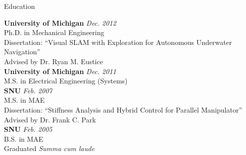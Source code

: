 \begin{rSection}{Education}

{\bf University of Michigan} \hfill {\em Dec. 2012} \\
Ph.D. in Mechanical Engineering \\
Dissertation: ``Visual SLAM with Exploration for Autonomous Underwater Navigation'' \\
Advised by Dr. Ryan M. Eustice \\

{\bf University of Michigan} \hfill {\em Dec. 2011} \\
M.S. in Electrical Engineering (Systems) \\

{\bf \ac{SNU}} \hfill {\em Feb. 2007} \\
M.S. in \acf{MAE} \\
Dissertation: ``Stiffness Analysis and Hybrid Control for Parallel Manipulator''\\
Advised by Dr. Frank C. Park\\

{\bf \acf{SNU}} \hfill {\em Feb. 2005} \\
B.S. in \acf{MAE} \\
Graduated \textit{Summa cum laude}\\
\end{rSection}

